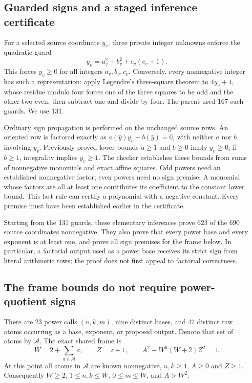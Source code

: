 \subsection{Guarded signs and a staged inference certificate}

For a selected source coordinate $y_v$, three private integer unknowns
enforce the quadratic guard
\begin{equation}\label{dc:guard}
 y_v=a_v^2+b_v^2+c_v(c_v+1).
\end{equation}
This forces $y_v\ge0$ for all integers $a_v,b_v,c_v$.  Conversely, every
nonnegative integer has such a representation: apply Legendre's
three-square theorem to $4y_v+1$, whose residue modulo four forces one
of the three squares to be odd and the other two even, then subtract
one and divide by four.  The parent used 167 such guards.  We use 131.

Ordinary sign propagation is performed on the unchanged source rows.
An oriented row is factored exactly as
$a(\widehat y)y_v-b(\widehat y)=0$, with neither $a$ nor $b$ involving
$y_v$.  Previously proved lower bounds $a\ge1$ and $b\ge0$ imply
$y_v\ge0$; if $b\ge1$, integrality implies $y_v\ge1$.
The checker establishes these bounds from sums of nonnegative
monomials and exact affine squares.  Odd powers need an established
nonnegative factor; even powers need no sign premise.  A monomial
whose factors are all at least one contributes its coefficient to
the constant lower bound.  This last rule can certify a polynomial
with a negative constant.  Every premise must have been established
earlier in the certificate.

Starting from the 131 guards, these elementary inferences prove 623
of the 690 source coordinates nonnegative.  They also prove that every
power base and every exponent is at least one, and prove all sign
premises for the frame below.  In particular, a factorial output used
as a power base receives its strict sign from literal arithmetic rows;
the proof does not first appeal to factorial correctness.

\subsection{The frame bounds do not require power-quotient signs}

There are 23 power calls $(n,k,m)$, nine distinct bases, and 47 distinct
raw atoms occurring as a base, exponent, or proposed output.  Denote
that set of atoms by $\mathcal A$.  The exact shared frame is
\begin{equation}\label{dc:frame}
 W=2+\sum_{a\in\mathcal A}a,
 \qquad Z=z+1,
 \qquad A^2-W^3(W+2)Z^2=1.
\end{equation}
At this point all atoms in $\mathcal A$ are known nonnegative,
$n,k\ge1$, $A\ge0$ and $Z\ge1$.  Consequently
$W\ge2$, $1\le n,k\le W$, $0\le m\le W$, and $A>W^2$.

